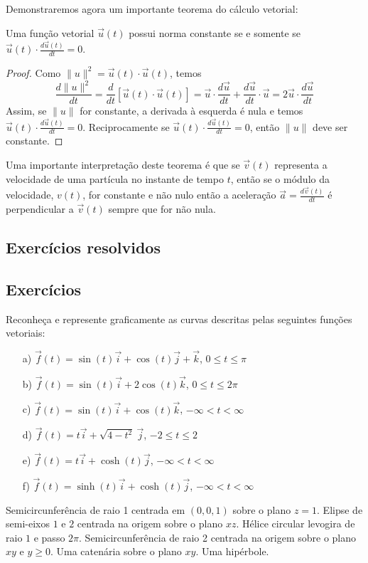 Demonstraremos agora um importante teorema do cálculo vetorial:
\begin{teo}\label{teodernormacst} Uma função vetorial $\vec{u}(t)$ possui norma constante se e somente se $\vec{u}(t)\cdot\frac{d\vec{u}(t)}{dt}=0$. 
\end{teo}
\begin{proof} Como $\|u\|^2=\vec{u}(t)\cdot\vec{u}(t)$, temos
$$\frac{d \|u\|^2}{dt}=\frac{d}{dt}\left[\vec{u}(t)\cdot\vec{u}(t)\right]=\vec{u}\cdot\frac{d\vec{u}}{dt}+\frac{d\vec{u}}{dt}\cdot\vec{u}=2\vec{u}\cdot\frac{d\vec{u}}{dt}$$
Assim, se $\|u\|$ for constante, a derivada à esquerda é nula e temos $\vec{u}(t)\cdot\frac{d\vec{u}(t)}{dt}=0$. Reciprocamente se $\vec{u}(t)\cdot\frac{d\vec{u}(t)}{dt}=0$, então $\|u\|$ deve ser constante.
\end{proof}
\begin{obs} Uma importante interpretação deste teorema é que se $\vec{v}(t)$ representa a velocidade de uma partícula no instante de tempo $t$, então se o módulo da velocidade, $v(t)$, for constante e não nulo então a aceleração $\vec{a}=\frac{d\vec{v}(t)}{dt}$ é perpendicular a $\vec{v}(t)$ sempre que for não nula.  
\end{obs}


\subsection*{Exercícios resolvidos}



\subsection*{Exercícios}

\begin{exer} Reconheça e represente graficamente as curvas descritas pelas seguintes funções vetoriais:
\begin{itemize}
\item [a)] $\vec{f}(t)=\sin(t)\vec{i}+\cos(t)\vec{j}+\vec{k}$, $0\leq t \leq \pi$
\item [b)] $\vec{f}(t)=\sin(t)\vec{i}+2\cos(t)\vec{k}$, $0\leq t \leq 2\pi$
\item [c)] $\vec{f}(t)=\sin(t)\vec{i}+\cos(t)\vec{k}$, $-\infty < t < \infty$
\item [d)] $\vec{f}(t)=t\vec{i}+\sqrt{4-t^2}~\!\vec{j}$, $-2 \leq t \leq 2$
\item [e)] $\vec{f}(t)=t\vec{i}+\cosh(t)\vec{j}$, $-\infty < t < \infty $
\item [f)] $\vec{f}(t)=\sinh(t)\vec{i}+\cosh(t)\vec{j}$, $-\infty < t< \infty $
\end{itemize} 
\end{exer}
\begin{resp} Semicircunferência de raio 1 centrada em $(0,0,1)$ sobre o plano $z=1$. Elipse de semi-eixos $1$ e $2$ centrada na origem sobre o plano $xz$. Hélice circular levogira de raio $1$ e passo $2\pi$.  Semicircunferência de raio 2 centrada na origem sobre o plano $xy$ e $y\geq 0$. Uma catenária sobre o plano $xy$. Uma hipérbole. 
\end{resp}

